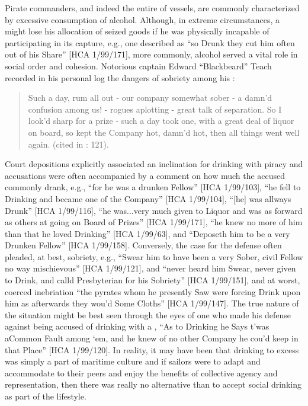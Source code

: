 Pirate commanders, and indeed the entire  of  vessels, are commonly characterized by excessive consumption of alcohol. Although, in extreme circumstances, a  might lose his allocation of seized goods if he was physically incapable of participating in its capture, e.g., one  described as “so Drunk they cut him often out of his Share” [HCA 1/99/171], more commonly, alcohol served a vital role in social order and cohesion. Notorious  captain Edward “Blackbeard” Teach recorded in his personal log the dangers of sobriety among his :

\begin{quotation}
Such a day, rum all out - our company somewhat sober - a damn’d confusion among us! - rogues aplotting - great talk of separation. So I look’d sharp for a prize - such a day took one, with a great deal of liquor on board, so kept the Company hot, damn’d hot, then all things went well again. (cited in \citealt{Bicheno2012}: 121).
\end{quotation}

Court depositions explicitly associated an inclination for drinking with piracy and accusations were often accompanied by a comment on how much the accused commonly drank, e.g., “for he was a drunken Fellow” [HCA 1/99/103], “he fell to Drinking and became one of the Company” [HCA 1/99/104], “[he] was allways Drunk” [HCA 1/99/116], “he was...very much given to Liquor and was as forward as others at going on Board of Prizes” [HCA 1/99/171], “he knew no more of him than that he loved Drinking” [HCA 1/99/63], and “Deposeth him to be a very Drunken Fellow” [HCA 1/99/158]. Conversely, the case for the defense often pleaded, at best, sobriety, e.g., “Swear him to have been a very Sober, civil Fellow no way mischievous” [HCA 1/99/121], and “never heard him Swear, never given to Drink, and calld Presbyterian for his Sobriety” [HCA 1/99/151], and at worst, coerced inebriation “the pyrates whom he presently Saw were forcing Drink upon him as afterwards they wou’d Some Cloths” [HCA 1/99/147]. The true nature of the situation might be best seen through the eyes of one  who made his defense against being accused of drinking with a  , “As to Drinking he Says t’was aCommon Fault among ‘em, and he knew of no other Company he cou’d keep in that Place” [HCA 1/99/120]. In reality, it may have been that drinking to excess was simply a part of maritime culture and if sailors were to adapt and accommodate to their peers and enjoy the benefits of collective agency and representation, then there was really no alternative than to accept social drinking as part of the lifestyle.  

